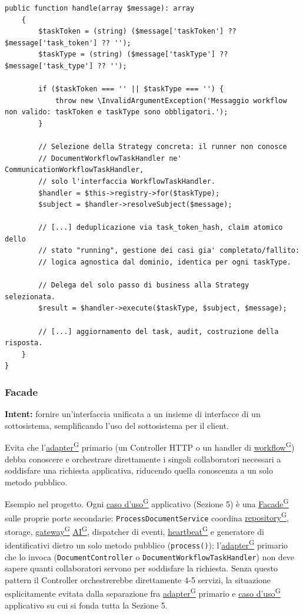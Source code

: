 \documentclass[a4paper,12pt]{article}
\providecommand{\glslink}[2]{\href{https://alittlebyte-19.github.io/Documentazione/glossario.html\#gls-#1}{\underline{#2}\textsuperscript{\scriptsize G}}}
\begin{document}
\begin{sloppypar}
\begin{lstlisting}[style=phplisting, caption={WorkflowTaskRunner -- selezione della Strategy concreta e delega del passo di business}]
    public function handle(array $message): array
    {
        $taskToken = (string) ($message['taskToken'] ?? $message['task_token'] ?? '');
        $taskType = (string) ($message['taskType'] ?? $message['task_type'] ?? '');

        if ($taskToken === '' || $taskType === '') {
            throw new \InvalidArgumentException('Messaggio workflow non valido: taskToken e taskType sono obbligatori.');
        }

        // Selezione della Strategy concreta: il runner non conosce
        // DocumentWorkflowTaskHandler ne' CommunicationWorkflowTaskHandler,
        // solo l'interfaccia WorkflowTaskHandler.
        $handler = $this->registry->for($taskType);
        $subject = $handler->resolveSubject($message);

        // [...] deduplicazione via task_token_hash, claim atomico dello
        // stato "running", gestione dei casi gia' completato/fallito:
        // logica agnostica dal dominio, identica per ogni taskType.

        // Delega del solo passo di business alla Strategy selezionata.
        $result = $handler->execute($taskType, $subject, $message);

        // [...] aggiornamento del task, audit, costruzione della risposta.
    }
}
\end{lstlisting}

\subsubsection{Facade}

\textbf{Intent:} fornire un'interfaccia unificata a un insieme di interfacce di un sottosistema, semplificando l'uso del sottosistema per il client.

Evita che l'\glslink{adapter}{adapter} primario (un Controller HTTP o un handler di \glslink{workflow}{workflow}) debba conoscere e orchestrare direttamente i singoli collaboratori necessari a soddisfare una richiesta applicativa, riducendo quella conoscenza a un solo metodo pubblico.

Esempio nel progetto. Ogni \glslink{caso-d-uso-uc}{caso d'uso} applicativo (Sezione 5) è una \glslink{facade}{Facade} sulle proprie porte secondarie: \texttt{ProcessDocumentService} coordina \glslink{repository}{repository}, storage, \glslink{gateway}{gateway} \glslink{intelligenza-artificiale-ai}{AI}, dispatcher di eventi, \glslink{heartbeat}{heartbeat} e generatore di identificativi dietro un solo metodo pubblico (\texttt{process()}); l'\glslink{adapter}{adapter} primario che lo invoca (\texttt{DocumentController} o \texttt{DocumentWorkflowTaskHandler}) non deve sapere quanti collaboratori servono per soddisfare la richiesta. Senza questo pattern il Controller orchestrerebbe direttamente 4-5 servizi, la situazione esplicitamente evitata dalla separazione fra \glslink{adapter}{adapter} primario e \glslink{caso-d-uso-uc}{caso d'uso} applicativo su cui si fonda tutta la Sezione 5.


\end{sloppypar}
\end{document}
